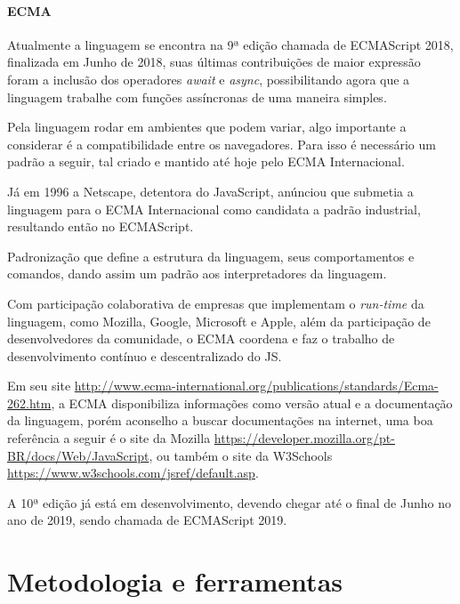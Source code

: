 \documentclass[
	12pt,				%
	openright,			%
	twoside,			%
	a4paper,			%
	english,			%
	brazil				%
	]{abntex2}
\begin{document}
\subsubsection{ECMA}
Atualmente a linguagem se encontra na 9ª edição chamada de ECMAScript 2018, finalizada em Junho de 2018, suas últimas contribuições de maior expressão foram a inclusão dos operadores \textit{await} e \textit{async}, possibilitando agora que a linguagem trabalhe com funções assíncronas de uma maneira simples. 

Pela linguagem rodar em ambientes que podem variar, algo importante a considerar é a compatibilidade entre os navegadores. Para isso é necessário um padrão a seguir, tal criado e mantido até hoje pelo ECMA Internacional.

Já em 1996 a Netscape, detentora do JavaScript, anúnciou que submetia a linguagem para o ECMA Internacional como candidata a padrão industrial, resultando então no ECMAScript.

Padronização que define a estrutura da linguagem, seus comportamentos e comandos, dando assim um padrão aos interpretadores da linguagem. 

Com participação colaborativa de empresas que implementam o \textit{run-time} da linguagem, como Mozilla, Google, Microsoft e Apple, além da participação de desenvolvedores da comunidade, o ECMA coordena e faz o trabalho de desenvolvimento contínuo e descentralizado do JS.

Em seu site \url{http://www.ecma-international.org/publications/standards/Ecma-262.htm}, a ECMA disponibiliza informações como versão atual e a documentação da linguagem, porém aconselho a buscar documentações na internet, uma boa referência a seguir é o site da Mozilla \url{https://developer.mozilla.org/pt-BR/docs/Web/JavaScript}, ou também o site da W3Schools \url{https://www.w3schools.com/jsref/default.asp}. 

A 10ª edição já está em desenvolvimento, devendo chegar até o final de Junho no ano de 2019, sendo chamada de ECMAScript 2019.

\chapter{Metodologia e ferramentas}

\end{document}
